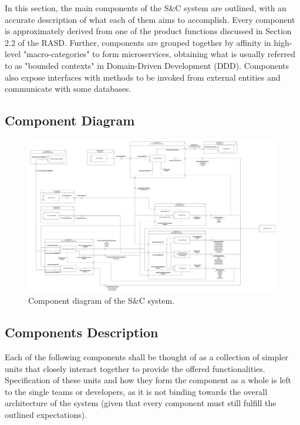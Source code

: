 In this section, the main components of the S\&C system are outlined, with an accurate description of what each of them aims to accomplish. Every component is approximately derived from one of the product functions discussed in Section 2.2 of the RASD. Further, components are grouped together by affinity in high-level "macro-categories" to form microservices, obtaining what is usually referred to as "bounded contexts" in Domain-Driven Development (DDD). Components also expose interfaces with methods to be invoked from external entities and communicate with some databases.

\subsection{Component Diagram}
\label{subsec:component_diagram}
\begin{figure} [H]
    \begin{center}
        \includegraphics[width=0.95\linewidth]{LaTeXCode/images/ComponentDiagram/component_view.png}
        \caption{Component diagram of the S\&C system.}
        \label{fig:component_diagram}
    \end{center}
\end{figure}

\subsection{Components Description}
\label{subsec:components_description}

Each of the following components shall be thought of as a collection of simpler units that closely interact together to provide the offered functionalities. Specification of these units and how they form the component as a whole is left to the single teams or developers, as it is not binding towards the overall architecture of the system (given that every component must still fulfill the outlined expectations).

